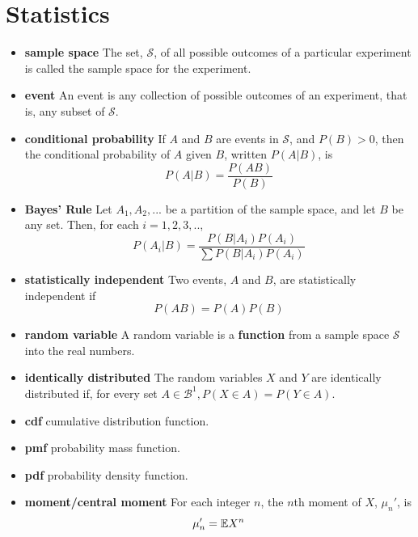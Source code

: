 \chapter{Statistics}
\begin{itemize}
    \item \textbf{sample space} The set, $\mathcal{S}$, of all possible outcomes of a particular experiment is called the sample space for the experiment.
    \item \textbf{event} An event is any collection of possible outcomes of an experiment, that is, any subset of $\mathcal{S}$.
    \item \textbf{conditional probability} If $A$ and $B$ are events in $\mathcal{S}$, and $P(B) > 0$, then the conditional probability of $A$ given $B$, written $P(A|B)$, is
        \begin{equation}
            P(A|B) = \frac{P(AB)}{P(B)}
        \end{equation}
    \item \textbf{Bayes' Rule} Let $A_1, A_2,...$ be a partition of the sample space, and let $B$ be any set. Then, for each $i = 1, 2, 3, ..$,
        \begin{equation}
            P(A_i|B) = \frac{P(B|A_i)P(A_i)}{\sum P(B|A_i)P(A_i)}
        \end{equation}
    \item \textbf{statistically independent} Two events, $A$ and $B$, are statistically independent if
        \begin{equation}
            P(AB) = P(A)P(B)
        \end{equation}
    \item \textbf{random variable} A random variable is a \textbf{function} from a sample space $\mathcal{S}$ into the real numbers.
    \item \textbf{identically distributed} The random variables $X$ and $Y$ are identically distributed if, for every set $A \in \mathcal{B}^1, P(X \in A) = P(Y \in A)$.
    \item \textbf{cdf} cumulative distribution function.
    \item \textbf{pmf} probability mass function.
    \item \textbf{pdf} probability density function.
    \item \textbf{moment/central moment} For each integer $n$, the $n$th moment of $X$, $\mu_n'$, is
        \begin{equation}
            \mu_n' = \mathbb{E} X^n
        \end{equation}

\end{itemize}
